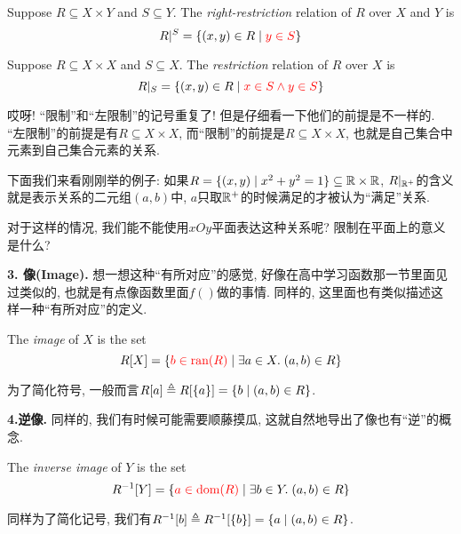 \begin{definition}
  Suppose $R \subseteq X \times Y$ and $S \subseteq Y$.
  The {\it right-restriction} relation of $R$  over $X$ and $Y$ is
  \[
    R|^{S} = \{(x, y) \in R \mid \textcolor{red}{y \in S}\}
  \]
\end{definition}

\begin{definition}[限制 (Restriction)]
  Suppose $R \subseteq X \times X$ and $S \subseteq X$.
  The {\it restriction} relation of $R$  over $X$ is
  \[
    R|_{S} = \{(x, y) \in R \mid \textcolor{red}{x \in S \land y \in S}\}
  \]
\end{definition}

哎呀! ``限制''和``左限制''的记号重复了! 但是仔细看一下他们的前提是不一样的. ``左限制''的前提是有$R \subseteq X \times X$, 而``限制''的前提是$R \subseteq X \times X$, 也就是自己集合中元素到自己集合元素的关系. 

下面我们来看刚刚举的例子: 如果$R = \{(x, y) \mid x^2 + y^2 = 1\} \subseteq \mathbb{R} \times \mathbb{R}$, $R|_{\mathbb{R}^{+}}$的含义就是表示关系的二元组$(a,b)中$, $a$只取$\mathbb{R}^+$的时候满足的才被认为``满足''关系. 

\begin{bonus}
对于这样的情况, 我们能不能使用$xOy$平面表达这种关系呢? 限制在平面上的意义是什么? 
\end{bonus}

\vspace*{1pt}
\textbf{3. 像(Image). } 想一想这种``有所对应''的感觉, 好像在高中学习函数那一节里面见过类似的, 也就是有点像函数里面$f()$做的事情.  同样的, 这里面也有类似描述这样一种``有所对应''的定义. 

\begin{definition}[像 (Image)]
  The {\it image} of $X$  is the set
  \[
    R[X] = \{\textcolor{red}{b \in \text{ran}(R)} \mid \exists a \in X.\; (a, b) \in R\}
  \]
\end{definition}
为了简化符号, 一般而言$R[a] \triangleq R[\{a\}] = \{b \mid (a, b) \in R\}$. 


\textbf{4.逆像. } 同样的, 我们有时候可能需要顺藤摸瓜, 这就自然地导出了像也有``逆''的概念. 

\begin{definition}
  The {\it inverse image} of $Y$  is the set
  \[
    R^{-1}[Y] = \{\textcolor{red}{a \in \text{dom}(R)} \mid \exists b \in Y.\; (a, b) \in R\}
  \]
\end{definition}
同样为了简化记号, 我们有$R^{-1}[b] \triangleq R^{-1}[\{b\}] = \{a \mid (a, b) \in R\}$. 

